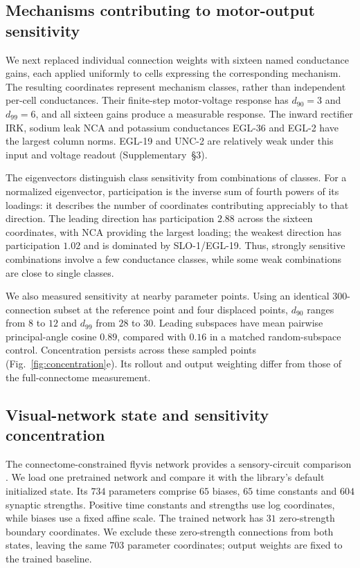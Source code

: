 \documentclass[11pt,letterpaper]{article}
\begin{document}
\subsection*{Mechanisms contributing to motor-output sensitivity}
We next replaced individual connection weights with sixteen named conductance gains, each applied uniformly to cells expressing the corresponding mechanism. The resulting coordinates represent mechanism classes, rather than independent per-cell conductances. Their finite-step motor-voltage response has $d_{90}=3$ and $d_{99}=6$, and all sixteen gains produce a measurable response. The inward rectifier IRK, sodium leak NCA and potassium conductances EGL-36 and EGL-2 have the largest column norms. EGL-19 and UNC-2 are relatively weak under this input and voltage readout (Supplementary~\S3).

The eigenvectors distinguish class sensitivity from combinations of classes. For a normalized eigenvector, participation is the inverse sum of fourth powers of its loadings: it describes the number of coordinates contributing appreciably to that direction. The leading direction has participation $2.88$ across the sixteen coordinates, with NCA providing the largest loading; the weakest direction has participation $1.02$ and is dominated by SLO-1/EGL-19. Thus, strongly sensitive combinations involve a few conductance classes, while some weak combinations are close to single classes.

We also measured sensitivity at nearby parameter points. Using an identical $300$-connection subset at the reference point and four displaced points, $d_{90}$ ranges from $8$ to $12$ and $d_{99}$ from $28$ to $30$. Leading subspaces have mean pairwise principal-angle cosine $0.89$, compared with $0.16$ in a matched random-subspace control. Concentration persists across these sampled points (Fig.~\ref{fig:concentration}e). Its rollout and output weighting differ from those of the full-connectome measurement.

\subsection*{Visual-network state and sensitivity concentration}
The connectome-constrained flyvis network provides a sensory-circuit comparison \citep{lappalainen2024connectome}. We load one pretrained network and compare it with the library's default initialized state. Its $734$ parameters comprise $65$ biases, $65$ time constants and $604$ synaptic strengths. Positive time constants and strengths use log coordinates, while biases use a fixed affine scale. The trained network has $31$ zero-strength boundary coordinates. We exclude these zero-strength connections from both states, leaving the same $703$ parameter coordinates; output weights are fixed to the trained baseline.
\end{document}
